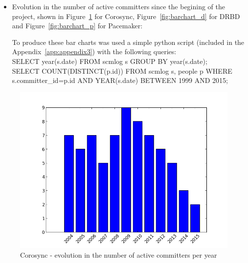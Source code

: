 \documentclass[a4paper, 12pt]{book}
\begin{document}
\begin{itemize}
      \item Evolution in the number of active committers since the begining of the project, shown in Figure~\ref{fig:barchart_c} for Corosync, Figure~\ref{fig:barchart_d} for DRBD and Figure~\ref{fig:barchart_p} for Pacemaker:

      To produce these bar charts was used a simple python script (included in the Appendix~\ref{app:appendix3}) with the following queries:\\
      SELECT year(s.date) FROM scmlog s GROUP BY year(s.date);\\
      SELECT COUNT(DISTINCT(p.id)) FROM scmlog s, people p WHERE s.committer\_id=p.id AND YEAR(s.date) BETWEEN 1999 AND 2015;
\end{itemize}

    \begin{figure}[H]
      \centering
      \includegraphics[scale=0.45]{barchart_c.png}
      \caption[Active committers for Corosync]{Corosync - evolution in the number of active committers per year}
      \label{fig:barchart_c}
    \end{figure}
	  
\end{document}

